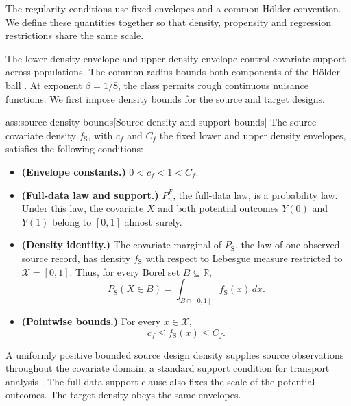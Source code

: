 The regularity conditions use fixed envelopes and a common Hölder convention. We define these quantities together so that density, propensity and regression restrictions share the same scale.



The lower density envelope  and upper density envelope  control covariate support across populations. The common radius  bounds both components of the Hölder ball . At exponent \(\beta=1/8\), the class permits rough continuous nuisance functions. We first impose density bounds for the source and target designs.

\begin{assumptionv}{ass:source-density-bounds}[Source density and support bounds]
The source covariate density \(f_{\mathrm S}\), with \(c_f\) and \(C_f\) the fixed lower and upper density envelopes, satisfies the following conditions:
\begin{itemize}
\item \textbf{(Envelope constants.)} \(0<c_f<1<C_f\).
\item \textbf{(Full-data law and support.)} \(P_n^F\), the full-data law, is a probability law. Under this law, the covariate \(X\) and both potential outcomes \(Y(0)\) and \(Y(1)\) belong to \([0,1]\) almost surely.
\item \textbf{(Density identity.)} The covariate marginal of \(P_{\mathrm S}\), the law of one observed source record, has density \(f_{\mathrm S}\) with respect to Lebesgue measure restricted to \(\mathcal X=[0,1]\). Thus, for every Borel set \(B\subseteq\mathbb R\),
\[
P_{\mathrm S}(X\in B)=\int_{B\cap[0,1]} f_{\mathrm S}(x)\,dx.
\]
\item \textbf{(Pointwise bounds.)} For every \(x\in\mathcal X\),
\[
c_f\le f_{\mathrm S}(x)\le C_f.
\]
\end{itemize}
\end{assumptionv}

A uniformly positive bounded source design density supplies source observations throughout the covariate domain, a standard support condition for transport analysis \citep{ZengKennedyBodnarNaimi2025Efficient}. The full-data support clause also fixes the scale of the potential outcomes. The target density obeys the same envelopes.


